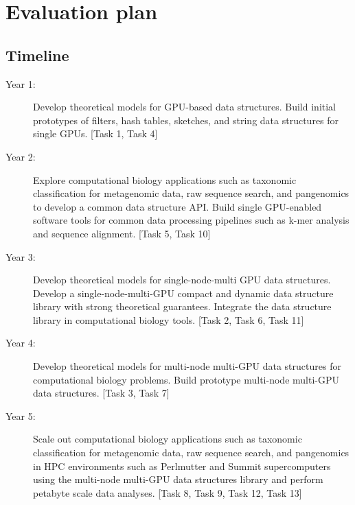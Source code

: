 \section{Evaluation plan}


\subsection{Timeline}
\begin{description}
\item [Year 1:] Develop theoretical models for GPU-based data structures. Build initial prototypes of filters, hash tables, sketches, and string data structures for single GPUs. [Task 1, Task 4]

\item [Year 2:] Explore computational biology applications such as taxonomic classification for metagenomic data, raw sequence search, and pangenomics to develop a common data structure API\@. Build single GPU-enabled software tools for common data processing pipelines such as k-mer analysis and sequence alignment. [Task 5, Task 10]

\item [Year 3:] Develop theoretical models for single-node-multi GPU data structures. Develop a single-node-multi-GPU compact and dynamic data structure library with strong theoretical guarantees. Integrate the data structure library in computational biology tools. [Task 2, Task 6, Task 11]

\item [Year 4:] Develop theoretical models for multi-node multi-GPU data structures for computational biology problems. Build prototype multi-node multi-GPU data structures. [Task 3, Task 7]

\item [Year 5:] Scale out computational biology applications such as taxonomic classification for metagenomic data, raw sequence search, and pangenomics in HPC environments such as Perlmutter and Summit supercomputers using the multi-node multi-GPU data structures library and perform petabyte scale data analyses. [Task 8, Task 9, Task 12, Task 13]
\end{description}



